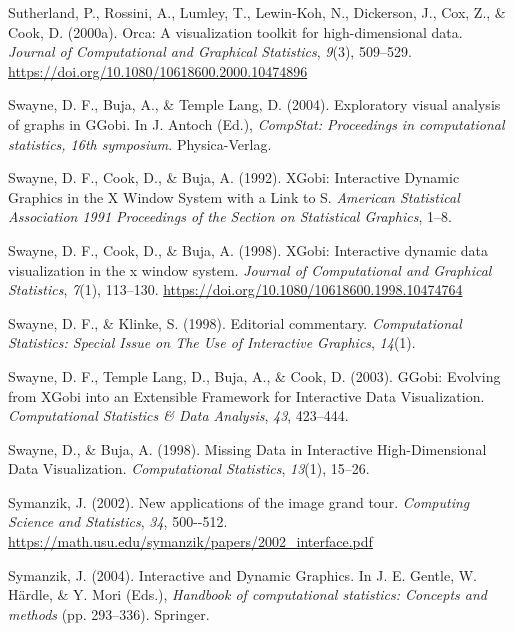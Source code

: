 \documentclass[
  letterpaper,
]{krantz}
\newlength{\cslhangindent}
\newenvironment{CSLReferences}[2] %
 {\begin{list}{}{%
  \setlength{\itemindent}{0pt}
  \setlength{\leftmargin}{0pt}
  \setlength{\parsep}{0pt}
  \ifodd #1
   \setlength{\leftmargin}{\cslhangindent}
   \setlength{\itemindent}{-1\cslhangindent}
  \fi
  \setlength{\itemsep}{#2\baselineskip}}}
 {\end{list}}
\begin{document}
\begin{CSLReferences}{1}{0}
Sutherland, P., Rossini, A., Lumley, T., Lewin-Koh, N., Dickerson, J.,
Cox, Z., \& Cook, D. (2000a). Orca: A visualization toolkit for
high-dimensional data. \emph{Journal of Computational and Graphical
Statistics}, \emph{9}(3), 509--529.
\url{https://doi.org/10.1080/10618600.2000.10474896}

Swayne, D. F., Buja, A., \& Temple Lang, D. (2004). Exploratory visual
analysis of graphs in {GG}obi. In J. Antoch (Ed.), \emph{CompStat:
Proceedings in computational statistics, 16th symposium}.
Physica-Verlag.

Swayne, D. F., Cook, D., \& Buja, A. (1992). {XG}obi: {I}nteractive
{D}ynamic {G}raphics in the {X} {W}indow {S}ystem with a {L}ink to {S}.
\emph{American Statistical Association 1991 Proceedings of the Section
on Statistical Graphics}, 1--8.

Swayne, D. F., Cook, D., \& Buja, A. (1998). XGobi: Interactive dynamic
data visualization in the x window system. \emph{Journal of
Computational and Graphical Statistics}, \emph{7}(1), 113--130.
\url{https://doi.org/10.1080/10618600.1998.10474764}

Swayne, D. F., \& Klinke, S. (1998). Editorial commentary.
\emph{Computational Statistics: Special Issue on The Use of Interactive
Graphics}, \emph{14}(1).

Swayne, D. F., Temple Lang, D., Buja, A., \& Cook, D. (2003). {GG}obi:
{E}volving from {XG}obi into an {E}xtensible {F}ramework for
{I}nteractive {D}ata {V}isualization. \emph{Computational Statistics \&
Data Analysis}, \emph{43}, 423--444.

Swayne, D., \& Buja, A. (1998). {M}issing {D}ata in {I}nteractive
{H}igh-{D}imensional {D}ata {V}isualization. \emph{Computational
Statistics}, \emph{13}(1), 15--26.

Symanzik, J. (2002). New applications of the image grand tour.
\emph{Computing Science and Statistics}, \emph{34}, 500-\/-512.
\url{https://math.usu.edu/symanzik/papers/2002_interface.pdf}

Symanzik, J. (2004). Interactive and {D}ynamic {G}raphics. In J. E.
Gentle, W. Härdle, \& Y. Mori (Eds.), \emph{Handbook of computational
statistics: Concepts and methods} (pp. 293--336). Springer.


\end{CSLReferences}
\end{document}

